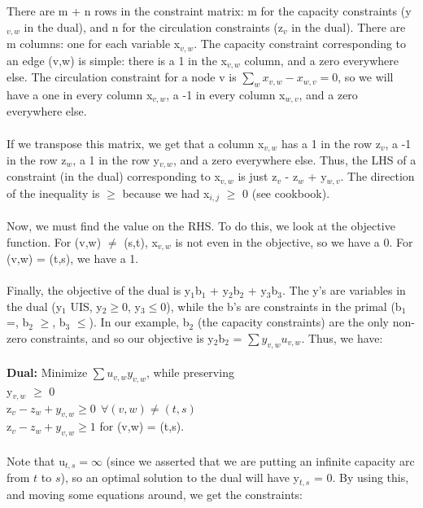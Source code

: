 \documentclass[11pt]{article}
\begin{document}
\\
\\
There are m + n rows in the constraint matrix: m for the capacity constraints (y$_{v,w}$ in the dual), and n for the circulation constraints (z$_{v}$ in the dual). There are m columns: one for each variable x$_{v,w}$. The capacity constraint corresponding to an edge (v,w) is simple: there is a 1 in the x$_{v,w}$ column, and a zero everywhere else. The circulation constraint for a node v is $\sum_{w} x_{v,w} - x_{w,v} = 0$, so we will have a one in every column x$_{v,w}$, a -1 in every column x$_{w,v}$, and a zero everywhere else.
\\
\\
If we transpose this matrix, we get that a column x$_{v,w}$ has a 1 in the row z$_{v}$, a -1 in the row z$_{w}$, a 1 in the row y$_{v,w}$, and a zero everywhere else. Thus, the LHS of a constraint (in the dual) corresponding to x$_{v,w}$ is just z$_{v}$ - z$_{w}$ + y$_{w,v}$. The direction of the inequality is $\geq$ because we had x$_{i,j}$ $\geq$ 0 (see cookbook).
\\
\\
Now, we must find the value on the RHS. To do this, we look at the objective function. For (v,w) $\neq$ (s,t), x$_{v,w}$ is not even in the objective, so we have a 0. For (v,w) = (t,s), we have a 1.
\\
\\
Finally, the objective of the dual is y$_{1}$b$_{1}$ + y$_{2}$b$_{2}$ + y$_{3}$b$_{3}$. The y's are variables in the dual (y$_{1}$ UIS, y$_{2} \geq 0$, y$_{3} \leq 0$), while the b's are constraints in the primal (b$_{1}$ =, b$_{2}$ $\geq$, b$_{3}$ $\leq$). In our example, b$_{2}$ (the capacity constraints) are the only non-zero constraints, and so our objective is y$_{2}$b$_{2}$ = $\sum y_{v,w}u_{v,w}$. Thus, we have:
\\
\\
{\bf Dual:} Minimize $\sum u_{v,w}y_{v,w}$, while preserving\\
y$_{v,w}$ $\geq$ 0\\
z$_{v} - z_{w} + y_{v,w} \geq 0 \ \ \forall (v,w) \neq (t,s)$\\
z$_{v} - z_{w} + y_{v,w} \geq 1$ for (v,w) = (t,s).
\\
\\
Note that u$_{t,s} = \infty$ (since we asserted that we are putting an infinite capacity arc from $t$ to $s$), so an optimal solution to the dual will have y$_{t,s}$ = 0. By using this, and moving some equations around, we get the constraints:
\end{document}

